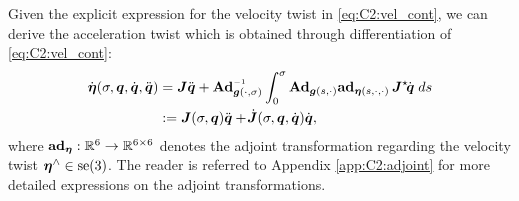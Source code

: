 Given the explicit expression for the velocity twist in \eqref{eq:C2:vel_cont}, we can derive the acceleration twist \cite{Boyer2021,Mochiyama2003,Renda2018} which is obtained through differentiation of \eqref{eq:C2:vel_cont}:
%
\begin{align}
\dot{\etaB}(\sigma,\q,\dq,\ddq) & = \JB \ddot{\q} + \Ad_{\gB(\cdot,\sigma)} \inv \int_0^\sigma \Ad_{\gB(s,\cdot)}
\ad_{\etaB(s,\cdot,\cdot)} \, \JB^\star\! \dq \;ds \notag \\
& :=  \JB(\sigma,\q)\ddot{\q} + \dmat{J}(\sigma,\q,\dot{\q}) \dot{\q},
\label{eq:C2:acceleration}
\end{align}
%
where $\textbf{ad}_{{\boldsymbol{\eta}}}: \mathbb{R}^{6} \to \mathbb{R}^{6\times 6}$ denotes the adjoint transformation regarding the velocity twist $\boldsymbol{{\boldsymbol{\eta}}}^\wedge \in \textup{\textrm{se}}(3)$. The reader is referred to Appendix \ref{app:C2:adjoint} for more detailed expressions on the adjoint transformations.
%
